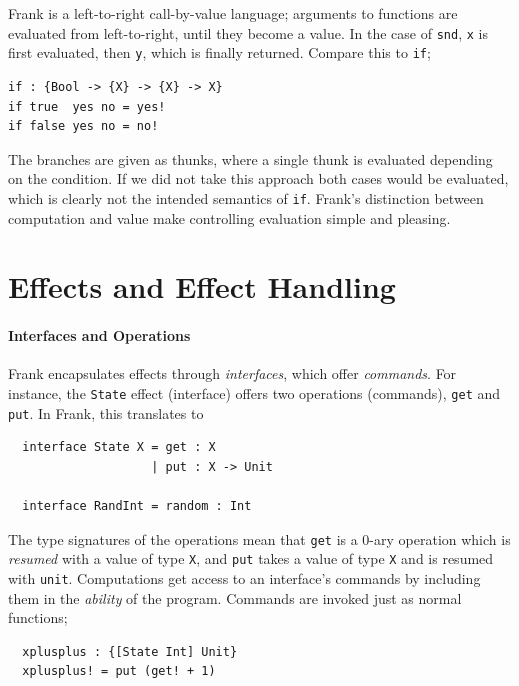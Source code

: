 \documentclass[msc,deptreport,cs]{infthesis} %
\newcommand{\code}[1]{\lstinline{#1}}
\newcommand{\todo}[1]
           {{\par\noindent\small\color{RoyalPurple}
  \framebox{\parbox{\dimexpr\linewidth-2\fboxsep-2\fboxrule}
    {\textbf{TODO:} #1}}}}
\begin{document}
Frank is a left-to-right call-by-value language; arguments to functions are
evaluated from left-to-right, until they become a value. In the case of
\code{snd}, \code{x} is first evaluated, then \code{y}, which is finally
returned. Compare this to \code{if};

\begin{lstlisting}
if : {Bool -> {X} -> {X} -> X}
if true  yes no = yes!
if false yes no = no!
\end{lstlisting}

\noindent The branches are given as thunks, where a single thunk is evaluated
depending on the condition. If we did not take this approach both cases would be
evaluated, which is clearly not the intended semantics of \code{if}. Frank's
distinction between computation and value make controlling evaluation simple and
pleasing.


\section{Effects and Effect Handling}
\label{sec:effects}

\paragraph*{Interfaces and Operations}

Frank encapsulates effects through \emph{interfaces}, which offer
\emph{commands}. For instance, the \code{State} effect (interface) offers two
operations (commands), \code{get} and \code{put}. In Frank, this translates to

\begin{lstlisting}
  interface State X = get : X
                    | put : X -> Unit

  interface RandInt = random : Int
\end{lstlisting}

The type signatures of the operations mean that \code{get} is a 0-ary operation
which is \emph{resumed} with a value of type \code{X}, and \code{put} takes a
value of type \code{X} and is resumed with \code{unit}. Computations get access
to an interface's commands by including them in the \emph{ability} of the
program. Commands are invoked just as normal functions;

\begin{lstlisting}
  xplusplus : {[State Int] Unit}
  xplusplus! = put (get! + 1)
\end{lstlisting}
\end{document}
